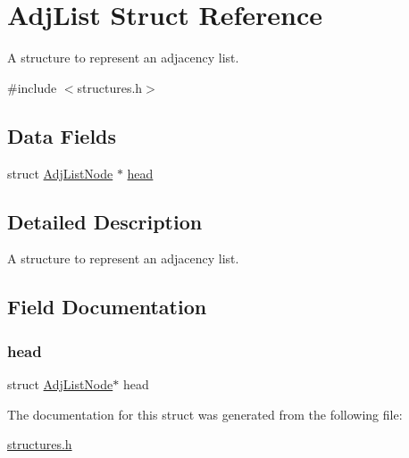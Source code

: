 \hypertarget{struct_adj_list}{}\section{Adj\+List Struct Reference}
\label{struct_adj_list}


A structure to represent an adjacency list.  




{\ttfamily \#include $<$structures.\+h$>$}

\subsection*{Data Fields}
\begin{DoxyCompactItemize}
\item 
struct \mbox{\hyperlink{struct_adj_list_node}{Adj\+List\+Node}} $\ast$ \mbox{\hyperlink{struct_adj_list_ab302cff0f9eb9d8e60459b0b73ec6745}{head}}
\end{DoxyCompactItemize}


\subsection{Detailed Description}
A structure to represent an adjacency list. 

\subsection{Field Documentation}
\mbox{\label{struct_adj_list_ab302cff0f9eb9d8e60459b0b73ec6745}} 
\subsubsection{\texorpdfstring{head}{head}}
{\footnotesize\ttfamily struct \mbox{\hyperlink{struct_adj_list_node}{Adj\+List\+Node}}$\ast$ head}



The documentation for this struct was generated from the following file\+:\begin{DoxyCompactItemize}
\item 
\mbox{\hyperlink{structures_8h}{structures.\+h}}\end{DoxyCompactItemize}
